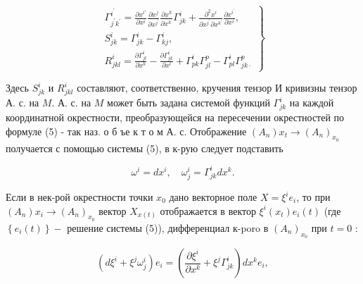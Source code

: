 \documentclass[10pt]{article}
\begin{document}
\[

\left.\begin{array}{c}

\Gamma_{j^{\prime} k^{\prime}}^{i^{\prime}}=\frac{\partial x^{i \prime}}{\partial x^{i}} \frac{\partial x^{j}}{\partial x^{j^{\prime}}} \frac{\partial x^{k}}{\partial x^{k^{\prime}}} \Gamma_{j k}^{i}+\frac{\partial^{2} x^{i}}{\partial x^{j^{\prime}} \partial x^{k^{\prime}}} \frac{\partial x^{i^{\prime}}}{\partial x^{i}}, \\

S_{j k}^{i}=\Gamma_{j k}^{i}-\Gamma_{k j}^{i}, \\

R_{j k l}^{i}=\frac{\partial \Gamma_{j l}^{i}}{\partial x^{k}}-\frac{\partial \Gamma_{j k}^{i}}{\partial x^{l}}+\Gamma_{p k}^{i} \Gamma_{j l}^{p}-\Gamma_{p l}^{i} \Gamma_{j k \cdot}^{p}

\end{array}\right\}

\]



Здесь $S_{j k}^{i}$ и $R_{j k l}^{i}$ составляют, соответственно, кручения тензор И кривизны тензор А. с. на $M$. А. с. на $M$ может быть задана системой функций $\Gamma_{j k}^{i}$ на каждой координатной окрестности, преобразующейся на пересечении окрестностей по формуле (5) - так наз. о б ъе к т о м А. с. Отображение $\left(A_{n}\right) x_{t} \rightarrow\left(A_{n}\right)_{x_{0}}$ получается с помощью системы (5), в к-рую следует подставить



\[

\omega^{i}=d x^{i}, \quad \omega_{j}^{i}=\Gamma_{j k}^{i} d x^{k} .

\]



Если в нек-рой окрестности точки $x_{0}$ дано векторное поле $X=\xi^{i} e_{i}$, то при $\left(A_{n}\right) x_{i} \rightarrow\left(A_{n}\right)_{x_{0}}$ вектор $X_{x(t)}$ отображается в вектор $\xi^{i}\left(x_{t}\right) e_{i}(t)$ (где $\left\{e_{i}(t)\right\}-$ решение системы (5)), дифференциал к-poro в $\left(A_{n}\right)_{x_{0}}$ при $t=0$ :



\[

\left(d \xi^{i}+\xi^{j} \omega_{j}^{i}\right) e_{i}=\left(\frac{\partial \xi^{i}}{\partial x^{k}}+\xi^{j} \Gamma_{j k}^{i}\right) d x^{k} e_{i},

\]
\end{document}
